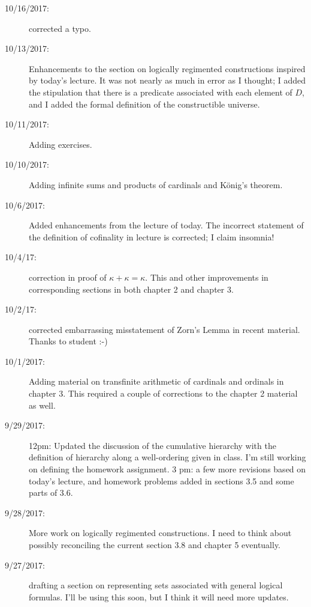 \documentclass[12pt]{book}
\begin{document}
{\begin{description}
\item[10/16/2017:]  corrected a typo.

\item[10/13/2017:]  Enhancements to the section on logically regimented constructions inspired by today's lecture.   It was not nearly as much in error as I thought;  I added the stipulation that there is a predicate associated with each element of $D$, and I added the formal definition of the constructible universe.

\item[10/11/2017:]  Adding exercises.

\item[10/10/2017:]  Adding infinite sums and products of cardinals and K\"onig's theorem.

\item[10/6/2017:]  Added enhancements from the lecture of today.  The incorrect statement of the definition of cofinality in lecture is corrected; I claim insomnia!

\item[10/4/17:]  correction in proof of $\kappa+\kappa=\kappa$.  This and other improvements in corresponding sections in both chapter 2 and chapter 3.

\item[10/2/17:]  corrected embarrassing misstatement of Zorn's Lemma in recent material.  Thanks to student :-)

\item[10/1/2017:]  Adding material on transfinite arithmetic of cardinals and ordinals in chapter 3.  This required a couple of corrections to the chapter 2 material as well.

\item[9/29/2017:]  12pm:  Updated the discussion of the cumulative hierarchy with the definition of hierarchy along a well-ordering given in class.  I'm still working on defining the homework assignment.  3 pm:  a few more revisions based on today's lecture, and homework problems added in sections 3.5 and some parts of 3.6.

\item[9/28/2017:]  More work on logically regimented constructions.  I need to think about possibly reconciling the current section 3.8 and chapter 5 eventually.

\item[9/27/2017:]  drafting a section on representing sets associated with general logical formulas.  I'll be using this soon, but I think it will need more updates.


\end{description}}
\end{document}
